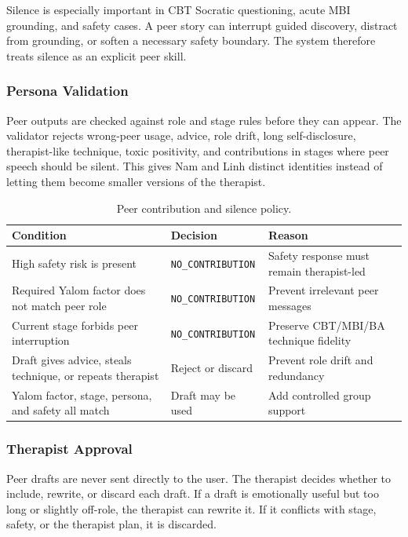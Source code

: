 Silence is especially important in CBT Socratic questioning, acute MBI grounding, and safety cases. A peer story can interrupt guided discovery, distract from grounding, or soften a necessary safety boundary. The system therefore treats silence as an explicit peer skill.

\subsubsection{Persona Validation}

Peer outputs are checked against role and stage rules before they can appear. The validator rejects wrong-peer usage, advice, role drift, long self-disclosure, therapist-like technique, toxic positivity, and contributions in stages where peer speech should be silent. This gives Nam and Linh distinct identities instead of letting them become smaller versions of the therapist.

\begin{table}[tb]
\centering
\caption{Peer contribution and silence policy.}
\label{tab:peer_decision_rules}
\small
\begin{tabular}{p{}p{}p{}}
\toprule
Condition & Decision & Reason \\
\midrule
High safety risk is present & \texttt{NO\_CONTRIBUTION} & Safety response must remain therapist-led \\
Required Yalom factor does not match peer role & \texttt{NO\_CONTRIBUTION} & Prevent irrelevant peer messages \\
Current stage forbids peer interruption & \texttt{NO\_CONTRIBUTION} & Preserve CBT/MBI/BA technique fidelity \\
Draft gives advice, steals technique, or repeats therapist & Reject or discard & Prevent role drift and redundancy \\
Yalom factor, stage, persona, and safety all match & Draft may be used & Add controlled group support \\
\bottomrule
\end{tabular}
\end{table}

\subsubsection{Therapist Approval}

Peer drafts are never sent directly to the user. The therapist decides whether to include, rewrite, or discard each draft. If a draft is emotionally useful but too long or slightly off-role, the therapist can rewrite it. If it conflicts with stage, safety, or the therapist plan, it is discarded.

